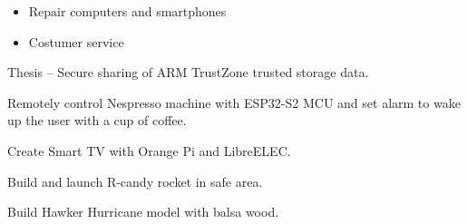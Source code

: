 \documentclass[10pt,a4paper,ragged2e,withhyper]{altacv}
\begin{document}
\begin{paracol}{2}
\begin{itemize}
\item Repair computers and smartphones
\item Costumer service
\end{itemize}

\medskip


\small Thesis -- Secure sharing of ARM TrustZone trusted storage data.



\medskip


\medskip


\medskip\divider\medskip


\switchcolumn


{\small Remotely control Nespresso machine with ESP32-S2 MCU and set alarm to wake up the user with a cup of coffee.}

\divider

\small Create Smart TV with Orange Pi and LibreELEC.

\divider

\small Build and launch R-candy rocket in safe area.

\divider

\small Build Hawker Hurricane model with balsa wood.


\divider

\divider

\divider



\end{paracol}
\end{document}
